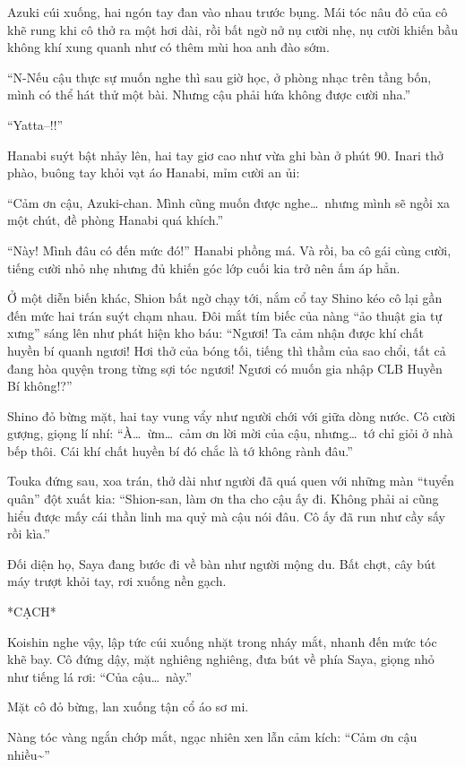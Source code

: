 \documentclass[../main.tex]{subfiles}
\begin{document}
Azuki cúi xuống, hai ngón tay đan vào nhau trước bụng. Mái tóc nâu đỏ của cô khẽ rung khi cô thở ra một hơi dài, rồi bất ngờ nở nụ cười nhẹ, nụ cười khiến bầu không khí xung quanh như có thêm mùi hoa anh đào sớm.

``N-Nếu cậu thực sự muốn nghe thì sau giờ học, ở phòng nhạc trên tầng bốn, mình có thể hát thử một bài. Nhưng cậu phải hứa không được cười nha.''

``Yatta--!!''

Hanabi suýt bật nhảy lên, hai tay giơ cao như vừa ghi bàn ở phút 90. Inari thở phào, buông tay khỏi vạt áo Hanabi, mỉm cười an ủi:

``Cảm ơn cậu, Azuki-chan. Mình cũng muốn được nghe\dots\ nhưng mình sẽ ngồi xa một chút, đề phòng Hanabi quá khích.''

``Này! Mình đâu có đến mức đó!'' Hanabi phồng má. Và rồi, ba cô gái cùng cười, tiếng cười nhỏ nhẹ nhưng đủ khiến góc lớp cuối kia trở nên ấm áp hẳn.

Ở một diễn biến khác, Shion bất ngờ chạy tới, nắm cổ tay Shino kéo cô lại gần đến mức hai trán suýt chạm nhau. Đôi mắt tím biếc của nàng ``ảo thuật gia tự xưng'' sáng lên như phát hiện kho báu: ``Ngươi! Ta cảm nhận được khí chất huyền bí quanh ngươi! Hơi thở của bóng tối, tiếng thì thầm của sao chổi, tất cả đang hòa quyện trong từng sợi tóc ngươi! Ngươi có muốn gia nhập CLB Huyền Bí không!?''

Shino đỏ bừng mặt, hai tay vung vẩy như người chới với giữa dòng nước. Cô cười gượng, giọng lí nhí: ``À\dots\ ừm\dots\ cảm ơn lời mời của cậu, nhưng\dots\ tớ chỉ giỏi ở nhà bếp thôi. Cái khí chất huyền bí đó chắc là tớ không rành đâu.''

Touka đứng sau, xoa trán, thở dài như người đã quá quen với những màn ``tuyển quân'' đột xuất kia: ``Shion-san, làm ơn tha cho cậu ấy đi. Không phải ai cũng hiểu được mấy cái thần linh ma quỷ mà cậu nói đâu. Cô ấy đã run như cầy sấy rồi kìa.''

Đối diện họ, Saya đang bước đi về bàn như người mộng du. Bất chợt, cây bút máy trượt khỏi tay, rơi xuống nền gạch.

*CẠCH*

Koishin nghe vậy, lập tức cúi xuống nhặt trong nháy mắt, nhanh đến mức tóc khẽ bay. Cô đứng dậy, mặt nghiêng nghiêng, đưa bút về phía Saya, giọng nhỏ như tiếng lá rơi: ``Của cậu\dots\ này.''

Mặt cô đỏ bừng, lan xuống tận cổ áo sơ mi.

Nàng tóc vàng ngắn chớp mắt, ngạc nhiên xen lẫn cảm kích:
``Cảm ơn cậu nhiều\~{}''
\end{document}
